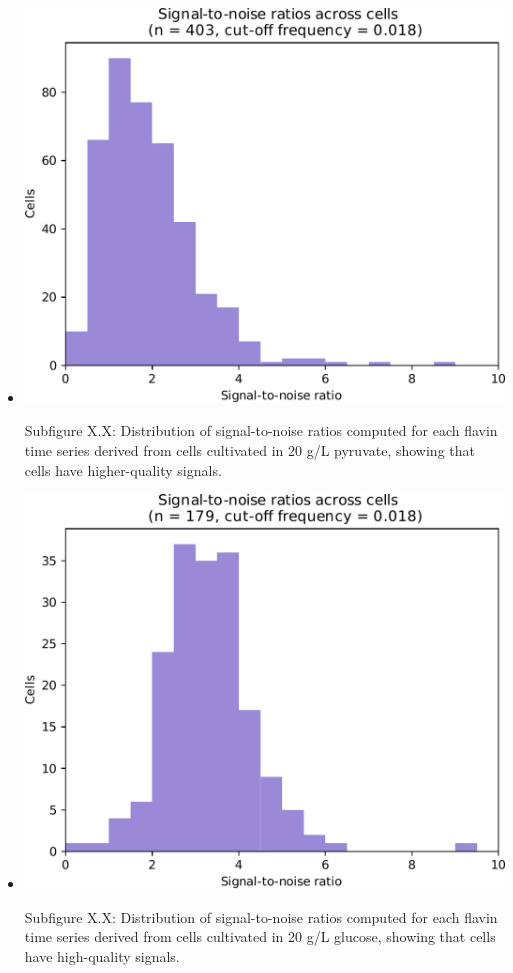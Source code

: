 \begin{itemize}
\begin{itemize}
\item \begin{center}
\includegraphics[width=.9\linewidth]{pyruvate_snr_edit.pdf}
\end{center} Subfigure X.X: Distribution of signal-to-noise ratios computed for each flavin time series derived from cells cultivated in 20 g/L pyruvate, showing that cells have higher-quality signals.
\item \begin{center}
\includegraphics[width=.9\linewidth]{glucose_snr_edit.pdf}
\end{center} Subfigure X.X: Distribution of signal-to-noise ratios computed for each flavin time series derived from cells cultivated in 20 g/L glucose, showing that cells have high-quality signals.
\end{itemize}
\end{itemize}


